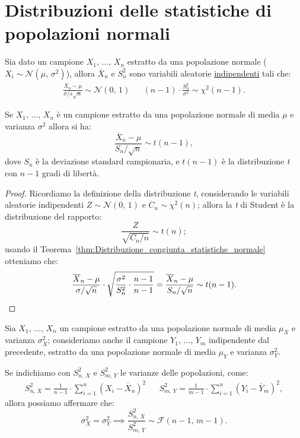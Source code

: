     \section{Distribuzioni delle statistiche di popolazioni normali}
        \begin{thm}\label{thm:Distribuzione_congiunta_statistiche_normale}
            Sia dato un campione $X_1,\, \ldots,\, X_{n}$ estratto da una popolazione normale 
            ($X_i \sim \mathcal{N}(\mu,\, \sigma^2)$), allora $\overline{X}_n$ e $S_n^2$ sono 
            variabili aleatorie \underline{indipendenti} tali che:
            \begin{align}\label{eq:Distribuzione_congiunta_statistiche_normale}
                \frac{\overline{X}_n -\mu}{\sigma /s\sqrt{n}} \sim \mathcal{N}(0,\,1)
                & & (n-1)\cdot \frac{S_n^2}{\sigma^2} \sim \chi^2(n-1)
            .\end{align}
        \end{thm}
        \begin{prty}
            Se $X_1,\, \ldots,\, X_{n}$ è un campione estratto da una popolazione normale di media $\mu$ e 
            varianza $\sigma^2$ allora si ha: \[
                \frac{\overline{X}_n - \mu}{S_n /\sqrt{n}} \sim t(n-1)
            ,\] dove $S_n$ è la deviazione standard campionaria, e $t(n-1)$ è la distribuzione 
            \emph{t} con $n-1$ gradi di libertà.
        \end{prty}
        \begin{proof}
            Ricordiamo la definizione della distribuzione \emph{t}, considerando le variabili 
            aleatorie indipendenti $Z \sim \mathcal{N}(0,\,1)$ e $C_n \sim \chi^2(n)$; allora la 
            \emph{t} di Student è la distribuzione del rapporto: \[
                \frac{Z}{\sqrt{C_n /n}} \sim t(n)
            ;\] usando il Teorema~\ref{thm:Distribuzione_congiunta_statistiche_normale} otteniamo che: \[
                \frac{\overline{X}_n - \mu}{\sigma /\sqrt{n}} \cdot \sqrt{\frac{\sigma^2}{S_n^2} 
                \cdot \frac{n-1}{n-1}} = \frac{\overline{X}_n - \mu}{S_n /\sqrt{n}}
                \sim t(n-1)
            .\qedhere\]
        \end{proof}
        \begin{prty}
            Sia $X_1,\, \ldots,\, X_{n}$ un campione estratto da una popolazione normale di media $\mu_X$ e 
            varianza $\sigma^2_X$; consideriamo anche il campione $Y_1,\, \ldots,\, Y_{m}$ indipendente 
            dal precedente, estratto da una popolazione normale di media $\mu_Y$ e varianza $\sigma^2_Y$.

            Se indichiamo con $S_{n,\,X}^2$ e $S_{m,\,Y}^2$ le varianze delle popolazioni, come:
            \begin{align*}
                S_{n,\,X}^2 = \frac{1}{n-1}\cdot \sum_{i=1}^{n} (X_i - \overline{X}_n)^2
                & & S_{m,\,Y}^2 = \frac{1}{m-1}\cdot \sum_{i=1}^{n} (Y_i - \overline{Y}_m)^2
            ,\end{align*}
            allora possiamo affermare che: \[
            \sigma_X^2 = \sigma_Y^2 \implies \frac{S_{n,\,X}^2}{S_{m,\,Y}^2} 
            \sim \mathcal{F}(n-1,\, m-1)
            .\]
        \end{prty}
